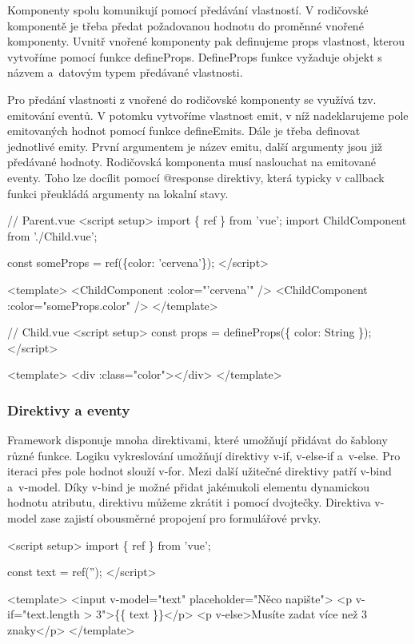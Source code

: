 Komponenty spolu komunikují pomocí předávání vlastností. V rodičovské komponentě je třeba předat požadovanou hodnotu do proměnné vnořené komponenty. 
Uvnitř vnořené komponenty pak definujeme props vlastnost, kterou vytvoříme pomocí funkce defineProps. 
DefineProps funkce vyžaduje objekt s názvem a~datovým typem předávané vlastnosti.

Pro předání vlastnosti z vnořené do rodičovské komponenty se využívá tzv. emitování eventů. 
V potomku vytvoříme vlastnost emit, v níž nadeklarujeme pole emitovaných hodnot pomocí funkce defineEmits. Dále je třeba definovat jednotlivé emity. 
První argumentem je název emitu, další argumenty jsou již předávané hodnoty. Rodičovská komponenta musí naslouchat na emitované eventy. 
Toho lze docílit pomocí @response direktivy, která typicky v callback funkci přeukládá argumenty na lokalní stavy.\cite{vuemacrae,vue}

\begin{prog}
// Parent.vue
<script setup>
  import \{ ref \} from 'vue';
  import ChildComponent from './Child.vue';

  const someProps = ref(\{color: 'cervena'\});
</script>

<template>
	<ChildComponent :color="'cervena'" />
  <ChildComponent :color="someProps.color" />
</template>

// Child.vue
<script setup>
  const props = defineProps(\{
    color: String
  \});
</script>

<template>
  <div :class="color"></div>
</template>
\end{prog}

\subsubsection{Direktivy a eventy}

Framework disponuje mnoha direktivami, které umožňují přidávat do šablony různé funkce. Logiku vykreslování umožňují direktivy v-if, v-else-if a~v-else. 
Pro iteraci přes pole hodnot slouží v-for. Mezi další užitečné direktivy patří v-bind a~v-model. 
Díky v-bind je možné přidat jakémukoli elementu dynamickou hodnotu atributu, direktivu můžeme zkrátit i pomocí dvojtečky. 
Direktiva v-model zase zajistí obousměrné propojení pro formulářové prvky.

\begin{prog}
<script setup>
  import \{ ref \} from 'vue';

  const text = ref('');
</script>

<template>
  <input v-model="text" placeholder="Něco napište">
  <p v-if="text.length > 3">\{\{ text \}\}</p>
  <p v-else>Musíte zadat více než 3 znaky</p>
</template> 
\end{prog}

